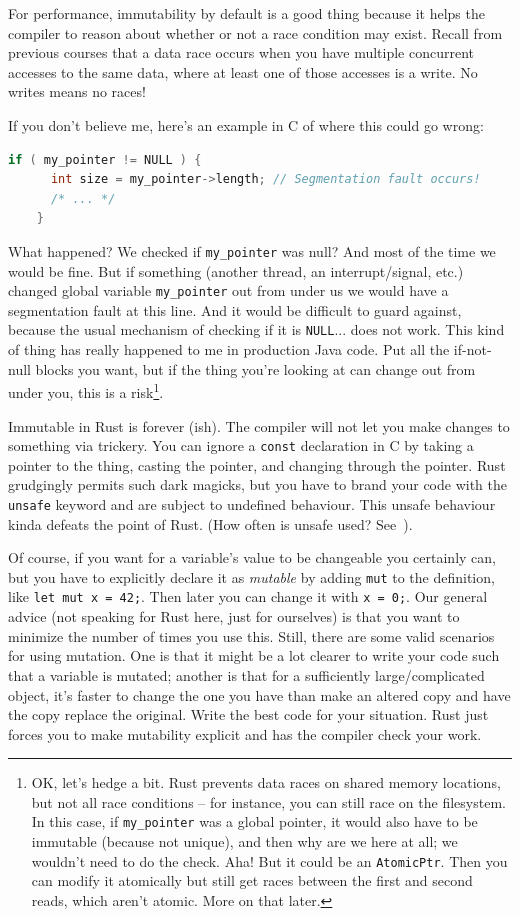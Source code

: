 For performance, immutability by default is a good thing because it helps the compiler to reason about whether or not a race condition may exist. Recall from previous courses that a data race occurs when you have multiple concurrent accesses to the same data, where at least one of those accesses is a write. No writes means no races! 

If you don't believe me, here's an example in C of where this could go wrong:
\begin{lstlisting}[language=C]
    if ( my_pointer != NULL ) {
      int size = my_pointer->length; // Segmentation fault occurs!
      /* ... */
    }
\end{lstlisting}

What happened? We checked if \texttt{my\_pointer} was null? And most of the time we would be fine. But if something (another thread, an interrupt/signal, etc.) changed global variable \texttt{my\_pointer} out from under us we would have a segmentation fault at this line. And it would be difficult to guard against, because the usual mechanism of checking if it is \texttt{NULL}... does not work. This kind of thing has really happened to me in production Java code. Put all the if-not-null blocks you want, but if the thing you're looking at can change out from under you, this is a risk\footnote{OK, let's hedge a bit. Rust prevents data races on shared memory locations, but not all race conditions -- for instance, you can still race on the filesystem. In this case, if \texttt{my\_pointer} was a global pointer, it would also have to be immutable (because not unique), and then why are we here at all; we wouldn't need to do the check. Aha! But it could be an \texttt{AtomicPtr}. Then you can modify it atomically but still get races between the first and second reads, which aren't atomic. More on that later.}.

Immutable in Rust is forever (ish). The compiler will not let you make changes to something via trickery. You can ignore a \texttt{const} declaration in C by taking a pointer to the thing, casting the pointer, and changing through the pointer. Rust grudgingly permits such dark magicks, but you have to brand your code with the \texttt{unsafe} keyword and are subject to undefined behaviour. This unsafe behaviour kinda defeats the point of Rust. (How often is unsafe used? See~\cite{astrauskas20:_how_progr_unsaf_rust}).

Of course, if you want for a variable's value to be changeable you certainly can, but you have to explicitly declare it as \textit{mutable} by adding \texttt{mut} to the definition, like \texttt{let mut x = 42;}. Then later you can change it with \texttt{x = 0;}. Our general advice (not speaking for Rust here, just for ourselves) is that you want to minimize the number of times you use this. Still, there are some valid scenarios for using mutation. One is that it might be a lot clearer to write your code such that a variable is mutated; another is that for a sufficiently large/complicated object, it's faster to change the one you have than make an altered copy and have the copy replace the original. Write the best code for your situation. Rust just forces you to make mutability explicit and has the compiler check your work.

